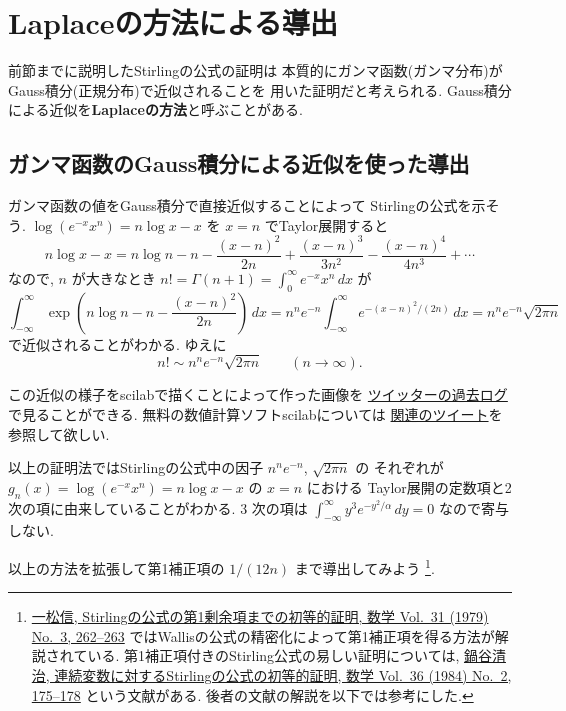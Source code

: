 \documentclass[12pt,twoside]{jarticle}
\theoremstyle{jplain}
\theoremstyle{jplain}
\theoremstyle{jplain}
\numberwithin{theorem}{section}
\numberwithin{equation}{section}
\numberwithin{figure}{section}
\numberwithin{table}{section}
\begin{document}

\section{Laplaceの方法による導出}
\label{sec:Laplace}

前節までに説明したStirlingの公式の証明は
本質的にガンマ函数(ガンマ分布)がGauss積分(正規分布)で近似されることを
用いた証明だと考えられる.
Gauss積分による近似を{\bf Laplaceの方法}と呼ぶことがある.


\subsection{ガンマ函数のGauss積分による近似を使った導出}


ガンマ函数の値をGauss積分で直接近似することによって
Stirlingの公式を示そう.
$\log(e^{-x}x^n)=n\log x-x$ を $x=n$ でTaylor展開すると
\[
n\log x - x
=n\log n-n
-\frac{(x-n)^2}{2n}
+\frac{(x-n)^3}{3n^2}
-\frac{(x-n)^4}{4n^3}
+\cdots
\]
なので, $n$ が大きなとき $n!=\Gamma(n+1)=\int_0^\infty e^{-x}x^n\,dx$ が
\[
\int_{-\infty}^\infty \exp\left(n\log n-n-\frac{(x-n)^2}{2n}\right)\,dx
=n^n e^{-n} \int_{-\infty}^\infty e^{-(x-n)^2/(2n)}\,dx
=n^n e^{-n} \sqrt{2\pi n}
\]
で近似されることがわかる. ゆえに
\[
n!\sim n^n e^{-n} \sqrt{2\pi n} \qquad (n\to\infty).
\]

この近似の様子をscilabで描くことによって作った画像を
\href{http://twilog.org/genkuroki/date-150709}
{ツイッターの過去ログ}で見ることができる.
無料の数値計算ソフトscilabについては
\href{http://twilog.org/genkuroki/search?word=scilab&ao=a}
{関連のツイート}を参照して欲しい.

以上の証明法ではStirlingの公式中の因子 $n^n e^{-n}$, $\sqrt{2\pi n}$ の
それぞれが $g_n(x)=\log(e^{-x}x^n)=n\log x-x$ の $x=n$ における
Taylor展開の定数項と2次の項に由来していることがわかる.
$3$ 次の項は $\int_{-\infty}^\infty y^3 e^{-y^2/\alpha}\,dy=0$ 
なので寄与しない.  

以上の方法を拡張して第1補正項の $1/(12n)$ まで導出してみよう%
\footnote{%
\href{https://www.jstage.jst.go.jp/article/sugaku1947/31/3/31_3_262/_article/references/-char/ja/}
{一松信, Stirlingの公式の第1剰余項までの初等的証明, 
数学 Vol.~31 (1979) No.~3, 262--263}
ではWallisの公式の精密化によって第1補正項を得る方法が解説されている.
第1補正項付きのStirling公式の易しい証明については, 
\href{https://www.jstage.jst.go.jp/article/sugaku1947/36/2/36_2_175/_article/references/-char/ja/}
{鍋谷清治, 連続変数に対するStirlingの公式の初等的証明, 
数学 Vol.~36 (1984) No.~2, 175--178}
という文献がある. 後者の文献の解説を以下では参考にした.}.
\end{document}
